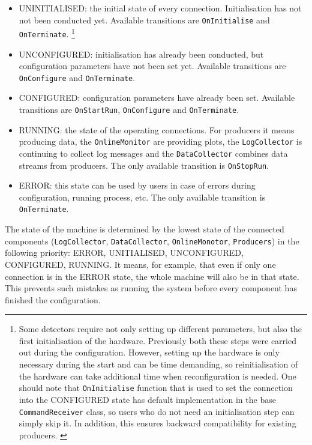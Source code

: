 \begin{itemize}
\item UNINITIALISED: the initial state of every connection. Initialisation has not not been conducted yet. Available transitions are \texttt{OnInitialise} and \texttt{OnTerminate}.%
\footnote{Some detectors require not only setting up different parameters, but also the first initialisation of the hardware. Previously both these steps were carried out during the configuration. However, setting up the hardware is only necessary during the start and can be time demanding, so reinitialisation of the hardware can take additional time when reconfiguration is needed.
One should note that \texttt{OnInitialise} function that is used to set the connection into the CONFIGURED state has default implementation in the base \texttt{CommandReceiver} class, so users who do not need an initialisation step can simply skip it. In addition, this ensures backward compatibility for existing producers. \cite{Shirokova:2016}}
\item UNCONFIGURED: initialisation has already been conducted, but configuration parameters have not been set yet. Available transitions are \texttt{OnConfigure} and \texttt{OnTerminate}.
\item CONFIGURED: configuration parameters have already been set. Available transitions are \texttt{OnStartRun}, \texttt{OnConfigure} and \texttt{OnTerminate}.
\item RUNNING: the state of the operating connections.  For producers it means producing data, the \texttt{OnlineMonitor} are providing plots, the \texttt{LogCollector} is continuing to collect log messages and the \texttt{DataCollector} combines data streams from producers. The only available transition is \texttt{OnStopRun}.
\item ERROR: this state can be used by users in case of errors during configuration, running process, etc. The only available transition is \texttt{OnTerminate}.
\end{itemize}

The state of the machine is determined by the lowest state of the connected components (\texttt{LogCollector}, \texttt{DataCollector}, \texttt{OnlineMonotor}, \texttt{Producers}) in the following priority: ERROR, UNITIALISED, UNCONFIGURED, CONFIGURED, RUNNING. It means, for example, that even if only one connection is in the ERROR state, the whole machine will also be in that state. This prevents such mistakes as running the system before every component has finished the configuration.

